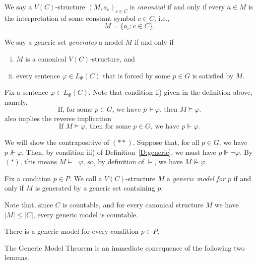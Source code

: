 \documentclass{scrartcl}
\renewcommand{\phi}{\varphi}
\begin{document}
\begin{definition}
\label{D:canonical}
We say a $V(C)$-structure $(M, a_c)_{c\in C}$ is \emph{canonical} if and only if every $a\in M$ is the interpretation of some constant symbol $c\in C$, i.e.,
\[
M = \{ a_c \colon c \in C \}.
\]
\end{definition}

\begin{definition}
We say a generic set \emph{generates} a model $M$ if and only if
\begin{enumerate}[i)]
\item
$M$ is a canonical $V(C)$-structure, and
\item
every sentence $\phi\in L_\Psi(C)$ that is forced by some $p\in G$ is satisfied by $M$.
\end{enumerate}

\end{definition}

Fix a sentence $\phi\in L_\Psi(C)$. Note that condition ii) given in the definition above, namely,
\[
\tag{$*$}
\text{If, for some } p\in G \text{, we have } p\Vdash \phi \text{, then } M\models \phi.
\]
also implies the reverse implication
\[
\tag{$**$}
\text{If } M\models \phi \text{, then for some } p\in G \text{, we have } p\Vdash \phi.
\]

We will show the contrapositive of $(**)$. Suppose that, for all $p\in G$, we have $p\not\Vdash \phi$. Then, by condition iii) of Definition~\ref{D:generic}, we must have $p\Vdash \neg \phi$. By $(*)$, this means $M\models \neg \phi$, so, by definition of $\models$, we have $M\not\models \phi$.



\begin{definition}
\label{D:generic model for p}
Fix a condition $p\in P$.
We call a $V(C)$-structure $M$ a \emph{generic model for $p$} if and only if $M$ is generated by a generic set containing $p$.
\end{definition}

Note that, since $C$ is countable, and for every canonical structure $M$ we have $|M|\le |C|$, every generic model is countable.



\begin{theorem}
There is a generic model for every condition $p\in P$.
\end{theorem}


The Generic Model Theorem is an immediate consequence of the following two lemmas.
\end{document}
